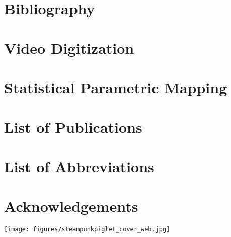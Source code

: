 \documentclass[12pt,a4paper,twoside]{report}
\newcommand\chng[1]{#1}
\begin{document}
 \singlespacing
 \section{Bibliography}
 \renewcommand{\bibname}{}
 \makeatletter
 \renewcommand{\chapter}{\@gobbletwo}
 \makeatother
 
 

\clearpage
\section{Video Digitization}\label{cpt:digitization}


\clearpage
\section{Statistical Parametric Mapping}\label{cpt:spm1d}


\clearpage
\section{\chng{List of Publications}}\label{cpt:publications}



\clearpage
\section{List of Abbreviations}\label{abbreviations}
\begin{spacing}{1.5}

\end{spacing}


\clearpage
\section{Acknowledgements}\label{acknowledgements}


\clearpage
\makeatletter
\vspace{\fill}
\texttt{[image: figures/steampunkpiglet\_cover\_web.jpg]}
\vspace{\fill}
\makeatother
\thispagestyle{empty}
\end{document}
